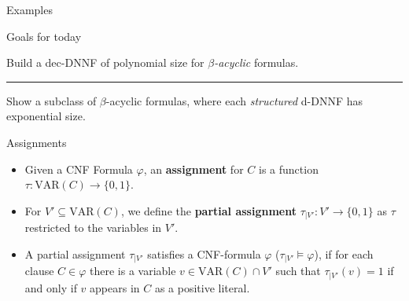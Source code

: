 \begin{frame}{Examples}
\end{frame}

\begin{frame}{Goals for today}
	\begin{minipage}[.3\textheight]{\textwidth}
		\centering
		Build a dec-DNNF of polynomial size for {\color{gray}\textit{$\beta$-acyclic} formulas}.
	\end{minipage}
	\vfill
	\hrule
	\vfill
	\begin{minipage}[.3\textheight]{\textwidth}
		\centering
		Show a subclass of $\beta$-acyclic formulas, where each {\color{gray}\textit{structured}} d-DNNF has exponential size.
	\end{minipage}
\end{frame}

\begin{frame}[t]{Assignments}
	\begin{itemize}[<+->]
		\item Given a CNF Formula $\varphi$, an \textbf{assignment} for $C$ is a function $\tau : \mathrm{VAR}(C) \rightarrow \{0, 1\}$.
		\item For $V' \subseteq \mathrm{VAR}(C)$, we define the \textbf{partial assignment} $\tau_{|V'} : V' \rightarrow \{0, 1\}$ as $\tau$ restricted to the variables in $V'$.
		\item A partial assignment $\tau_{|V'}$ satisfies a CNF-formula $\varphi$ ($\tau_{|V'} \models \varphi$), if for each clause $C \in \varphi$ there is a variable $v \in \mathrm{VAR}(C) \cap V'$ such that $\tau_{|V'}(v) = 1$ if and only if $v$ appears in $C$ as a positive literal.

	\end{itemize}
\end{frame}


